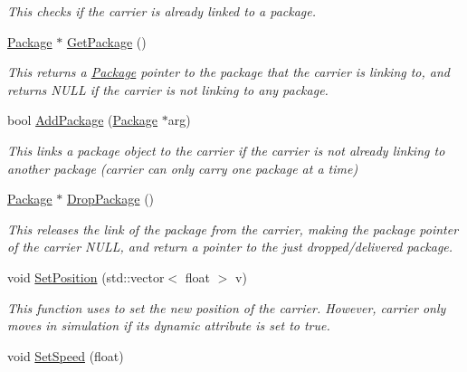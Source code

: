 \begin{DoxyCompactItemize}
\begin{DoxyCompactList}\small\item\em This checks if the carrier is already linked to a package. \end{DoxyCompactList}\item 
\mbox{\label{classcsci3081_1_1Carrier_a8938441bb8d2984178eb75b4ce45e6b9}} 
\hyperlink{classcsci3081_1_1Package}{Package} $\ast$ \hyperlink{classcsci3081_1_1Carrier_a8938441bb8d2984178eb75b4ce45e6b9}{Get\+Package} ()
\begin{DoxyCompactList}\small\item\em This returns a \hyperlink{classcsci3081_1_1Package}{Package} pointer to the package that the carrier is linking to, and returns N\+U\+LL if the carrier is not linking to any package. \end{DoxyCompactList}\item 
bool \hyperlink{classcsci3081_1_1Carrier_a8b1996acbdeb796bcbc68f8d092e09c0}{Add\+Package} (\hyperlink{classcsci3081_1_1Package}{Package} $\ast$arg)
\begin{DoxyCompactList}\small\item\em This links a package object to the carrier if the carrier is not already linking to another package (carrier can only carry one package at a time) \end{DoxyCompactList}\item 
\hyperlink{classcsci3081_1_1Package}{Package} $\ast$ \hyperlink{classcsci3081_1_1Carrier_a6fa3861b1b7acb89827e768308196cc1}{Drop\+Package} ()
\begin{DoxyCompactList}\small\item\em This releases the link of the package from the carrier, making the package pointer of the carrier N\+U\+LL, and return a pointer to the just dropped/delivered package. \end{DoxyCompactList}\item 
void \hyperlink{classcsci3081_1_1Carrier_aede9d79fffb164f90fe30b19f2e2c854}{Set\+Position} (std\+::vector$<$ float $>$ v)
\begin{DoxyCompactList}\small\item\em This function uses to set the new position of the carrier. However, carrier only moves in simulation if its dynamic attribute is set to true. \end{DoxyCompactList}\item 
void \hyperlink{classcsci3081_1_1Carrier_a1f74a376887685a69b3d0512eb97188e}{Set\+Speed} (float)

\end{DoxyCompactItemize}

